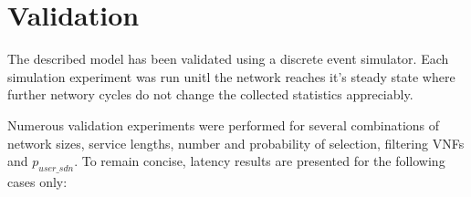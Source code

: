 
\section{Validation}
\label{sec:validation}
The described model has been validated using a discrete event simulator. Each simulation experiment was run unitl the network reaches it's steady state where further networy cycles do not change the collected statistics appreciably. 

Numerous validation experiments were performed for several combinations of network sizes, service lengths, number and probability of selection, filtering VNFs and $p_{user\_sdn}$. To remain concise, latency results are presented for the following cases only:

